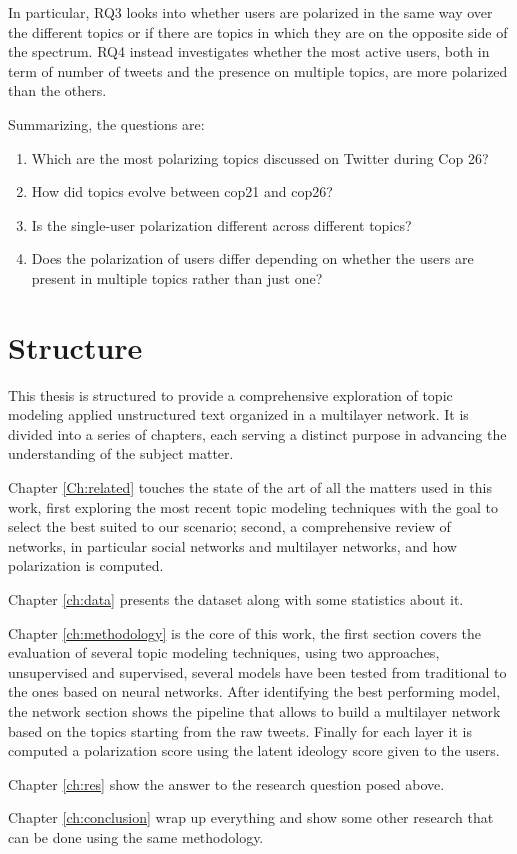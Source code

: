 In particular, RQ3 looks into whether  users are polarized in the same way over the different topics or if there are topics in which they are on the opposite side of the spectrum. RQ4 instead investigates whether the most active users, both in term of number of tweets and the presence on multiple topics, are more polarized than the others.

Summarizing, the questions are:

\begin{enumerate}
    \item  Which are the most polarizing topics discussed on Twitter during Cop 26?
    \item How did topics evolve between cop21 and cop26?
    \item Is the single-user polarization different across different topics? 
    \item Does the polarization of users differ depending on whether the users are present in multiple topics rather than just one?


\end{enumerate}

\section{Structure}
This thesis is structured to provide a comprehensive exploration of  topic modeling applied unstructured text organized in a multilayer network. It is divided into a series of chapters, each serving a distinct purpose in advancing the understanding of the subject matter. 

Chapter \ref{Ch:related} touches the state of the art of all the matters used in this work, first exploring the most recent topic modeling techniques with the goal to select the best suited to our scenario; second, a comprehensive review of networks, in particular social networks and multilayer networks, and how polarization is computed.

Chapter \ref{ch:data} presents the dataset along with some statistics about it.

Chapter \ref{ch:methodology} is the core of this work, the first section covers the evaluation of several topic modeling techniques, using two approaches, unsupervised and supervised, several models have been tested from traditional to the ones based on neural networks. After identifying the best performing model, the network section shows the pipeline that allows to build a multilayer network based on the topics starting from the raw tweets. Finally for each layer it is computed a polarization score using the latent ideology score given to the users.

Chapter \ref{ch:res}  show the answer to the research question posed above.  

Chapter \ref{ch:conclusion} wrap up everything and show some other research that can be done using the same methodology.







